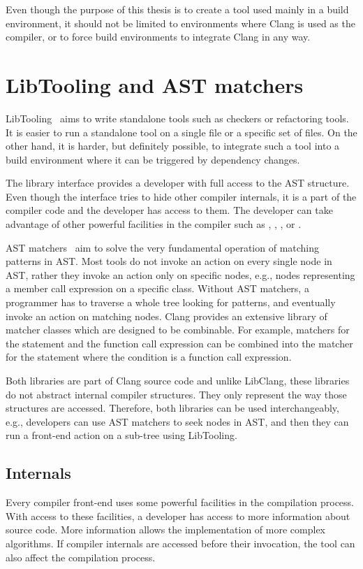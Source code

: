 Even though the purpose of this thesis is to create a tool used mainly in a build environment, it should not be limited to environments where Clang is used as the compiler, or to force build environments to integrate Clang in any way.

\section{LibTooling and AST matchers}
LibTooling~\cite{clang-libtooling} aims to write standalone tools such as checkers or refactoring tools. It is easier to run a standalone tool on a single file or a specific set of files. On the other hand, it is harder, but definitely possible, to integrate such a tool into a build environment where it can be triggered by dependency changes.

The library interface provides a developer with full access to the AST structure. Even though the interface tries to hide other compiler internals, it is a part of the compiler code and the developer has access to them. The developer can take advantage of other powerful facilities in the compiler such as , , ,  or .

AST matchers~\cite{clang-matchers} aim to solve the very fundamental operation of matching patterns in AST. Most tools do not invoke an action on every single node in AST, rather they invoke an action only on specific nodes, e.g., nodes representing a member call expression on a specific class. Without AST matchers, a programmer has to traverse a whole tree looking for patterns, and eventually invoke an action on matching nodes. Clang provides an extensive library of matcher classes which are designed to be combinable. For example, matchers for the  statement and the function call expression can be combined into the matcher for the  statement where the condition is a function call expression.

Both libraries are part of Clang source code and unlike LibClang, these libraries do not abstract internal compiler structures. They only represent the way those structures are accessed. Therefore, both libraries can be used interchangeably, e.g., developers can use AST matchers to seek nodes in AST, and then they can run a front-end action on a sub-tree using LibTooling.

\subsection{Internals}
Every compiler front-end uses some powerful facilities in the compilation process. With access to these facilities, a developer has access to more information about source code. More information allows the implementation of more complex algorithms. If compiler internals are accessed before their invocation, the tool can also affect the compilation process.

